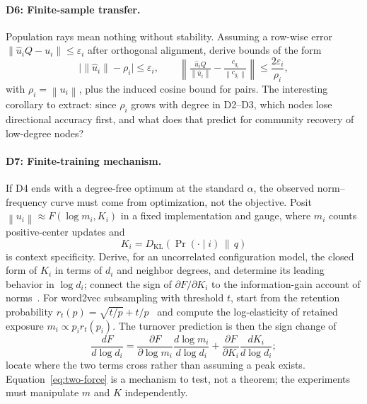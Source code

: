 \documentclass[11pt]{article}
\newcommand{\norm}[1]{\left\lVert#1\right\rVert}
\newcommand{\KL}{D_{\text{KL}}}
\begin{document}
\paragraph{D6: Finite-sample transfer.}
Population rays mean nothing without stability.
Assuming a row-wise error \(\norm{\widehat{u}_iQ-u_i}\leq\varepsilon_i\) after orthogonal alignment, derive bounds of the form
\begin{equation}
    \bigl|\norm{\widehat{u}_i}-\rho_i\bigr|\leq\varepsilon_i,
    \qquad
    \norm{\tfrac{\widehat{u}_iQ}{\norm{\widehat{u}_i}}-\tfrac{c_{g_i}}{\norm{c_{g_i}}}}
    \leq \frac{2\varepsilon_i}{\rho_i},
    \label{eq:stability}
\end{equation}
with \(\rho_i=\norm{u_i}\), plus the induced cosine bound for pairs.
The interesting corollary to extract: since \(\rho_i\) grows with degree in D2--D3, which nodes lose directional accuracy first, and what does that predict for community recovery of low-degree nodes?

\paragraph{D7: Finite-training mechanism.}
If D4 ends with a degree-free optimum at the standard \(\alpha\), the observed norm--frequency curve must come from optimization, not the objective.
Posit \(\norm{u_i}\approx F(\log m_i, K_i)\) in a fixed implementation and gauge, where \(m_i\) counts positive-center updates and
\begin{equation}
    K_i=\KL\!\left(\Pr(\cdot\mid i)\,\middle\|\,q\right)
    \label{eq:specificity}
\end{equation}
is context specificity.
Derive, for an uncorrelated configuration model, the closed form of \(K_i\) in terms of \(d_i\) and neighbor degrees, and determine its leading behavior in \(\log d_i\); connect the sign of \(\partial F/\partial K_i\) to the information-gain account of norms~\citep{oyama2023}.
For word2vec subsampling with threshold \(t\), start from the retention probability \(r_t(p)=\sqrt{t/p}+t/p\)~\citep{mikolov2013distributed} and compute the log-elasticity of retained exposure \(m_i\propto p_i r_t(p_i)\).
The turnover prediction is then the sign change of
\begin{equation}
    \frac{dF}{d\log d_i}
    =
    \frac{\partial F}{\partial\log m_i}\frac{d\log m_i}{d\log d_i}
    +
    \frac{\partial F}{\partial K_i}\frac{dK_i}{d\log d_i};
    \label{eq:two-force}
\end{equation}
locate where the two terms cross rather than assuming a peak exists.
Equation~\eqref{eq:two-force} is a mechanism to test, not a theorem; the experiments must manipulate \(m\) and \(K\) independently.
\end{document}
